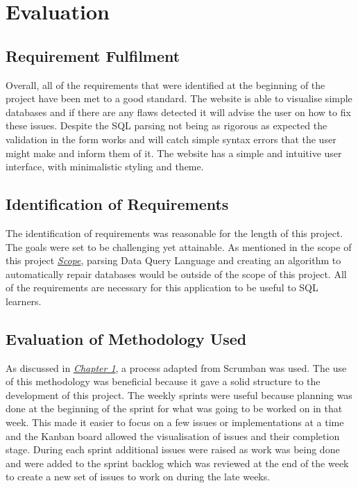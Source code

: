 \chapter{Evaluation}

\section{Requirement Fulfilment}

Overall, all of the requirements that were identified at the beginning of the project have been met to a good standard. The website is able to visualise simple databases and if there are any flaws detected it will advise the user on how to fix these issues. Despite the SQL parsing not being as rigorous as expected the validation in the form works and will catch simple syntax errors that the user might make and inform them of it. The website has a simple and intuitive user interface, with minimalistic styling and theme.

\section{Identification of Requirements}

The identification of requirements was reasonable for the length of this project. The goals were set to be challenging yet attainable. As mentioned in the scope of this project \textit{\hyperref[subsec:scope]{Scope}}, parsing Data Query Language and creating an algorithm to automatically repair databases would be outside of the scope of this project. All of the requirements are necessary for this application to be useful to SQL learners.

\section{Evaluation of Methodology Used}

As discussed in \textit{\hyperref[sec:process]{Chapter 1}}, a process adapted from Scrumban was used. The use of this methodology was beneficial because it gave a solid structure to the development of this project. The weekly sprints were useful because planning was done at the beginning of the sprint for what was going to be worked on in that week. This made it easier to focus on a few issues or implementations at a time and the Kanban board allowed the visualisation of issues and their completion stage. During each sprint additional issues were raised as work was being done and were added to the sprint backlog which was reviewed at the end of the week to create a new set of issues to work on during the late weeks. 

